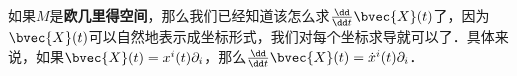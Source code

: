 





如果$M$是\textbf{欧几里得空间}，那么我们已经知道该怎么求$\frac{\dd}{\dd t}\bvec{X}(t)$了，因为$\bvec{X}(t)$可以自然地表示成坐标形式，我们对每个坐标求导就可以了．具体来说，如果$\bvec{X}(t)=x^i(t)\partial_i$，那么$\frac{\dd}{\dd t}\bvec{X}(t)=\dot{x}^i(t)\partial_i$．

